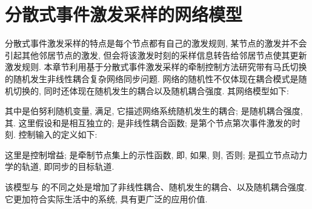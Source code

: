 \section{分散式事件激发采样的网络模型}\label{csnp:sec:moper}
        分散式事件激发采样的特点是每个节点都有自己的激发规则, 某节点的激发并不会引起其他邻居节点的激发, 但会将该激发时刻的采样信息转告给邻居节点使其更新激发规则. 本章节利用基于分散式事件激发采样的牵制控制方法研究带有马氏切换的随机发生非线性耦合复杂网络同步问题. 网络的随机性不仅体现在耦合模式是随机切换的, 同时还体现在随机发生的耦合以及随机耦合强度. 其网络模型如下:
        \begin{comment}\label{sys:init1}
        \nonumber\dot{x}_{i}(t)&=f(x_{i}(t))-\theta(t)\rho(t)\sum^N_{j=1}l_{ij}(r_{t})\Gamma[h(x_{j}(t_{k}^{i}))-h(x_{i}(t_{k}^{i}))]+u_i(t), \\
        &\quad t_{k}^i\leq t< t_{k+1}^i, i = 1,\cdots,N,
        \end{comment}
        其中是伯努利随机变量, 满足, 它描述网络系统随机发生的耦合;
        是随机耦合强度, 其. 这里假设和是相互独立的;  是非线性耦合函数;
        是第个节点第次事件激发的时刻.
        控制输入的定义如下:
        \begin{comment}\label{nonlinearcontrol}
            u_i(t)=-\tau \rho(t)d_{i}(r_{t})\Gamma[h(x_{i}(t_{k}^{i}))-h(s(t_{k}^{i}))],
        \end{comment}
        这里是控制增益; 是牵制节点集上的示性函数, 即, 如果, 则, 否则;  是孤立节点动力学的轨道, 即同步的目标轨道.
        \begin{rem}
            该模型与  的不同之处是增加了非线性耦合、随机发生的耦合、以及随机耦合强度. 它更加符合实际生活中的系统, 具有更广泛的应用价值.
        \end{rem}

